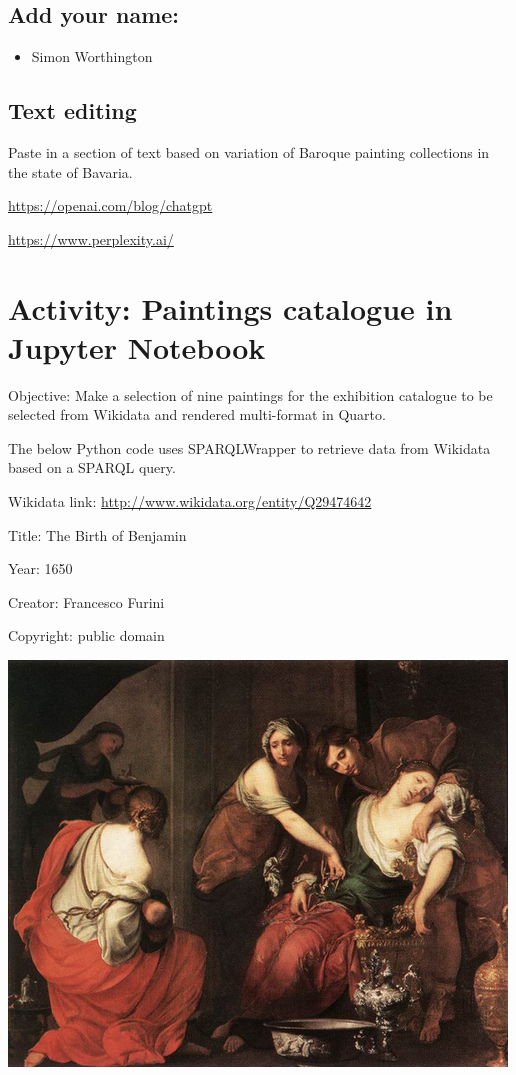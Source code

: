 \documentclass[
  letterpaper,
]{book}
\providecommand{\tightlist}{%
  \setlength{\itemsep}{0pt}\setlength{\parskip}{0pt}}\usepackage{longtable,booktabs,array}
\begin{document}
\hypertarget{add-your-name}{%
\section{Add your name:}\label{add-your-name}}

\begin{itemize}
\tightlist
\item
  Simon Worthington
\end{itemize}

\hypertarget{text-editing}{%
\section{Text editing}\label{text-editing}}

Paste in a section of text based on variation of Baroque painting
collections in the state of Bavaria.

\url{https://openai.com/blog/chatgpt}

\url{https://www.perplexity.ai/}


\hypertarget{activity-paintings-catalogue-in-jupyter-notebook}{%
\chapter{Activity: Paintings catalogue in Jupyter
Notebook}\label{activity-paintings-catalogue-in-jupyter-notebook}}

Objective: Make a selection of nine paintings for the exhibition
catalogue to be selected from Wikidata and rendered multi-format in
Quarto.

The below Python code uses SPARQLWrapper to retrieve data from Wikidata
based on a SPARQL query.

Wikidata link: \url{http://www.wikidata.org/entity/Q29474642}

Title: The Birth of Benjamin

Year: 1650

Creator: Francesco Furini

Copyright: public domain

\includegraphics{./paintings_files/figure-pdf/cell-2-output-2.png}
\end{document}
